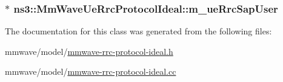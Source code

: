 \subsubsection[{\texorpdfstring{m\+\_\+ue\+Rrc\+Sap\+User}{m_ueRrcSapUser}}]{$\ast$ ns3\+::\+Mm\+Wave\+Ue\+Rrc\+Protocol\+Ideal\+::m\+\_\+ue\+Rrc\+Sap\+User\hspace{0.3cm}{\ttfamily [private]}}\hypertarget{classns3_1_1MmWaveUeRrcProtocolIdeal_abc6f2ed7e6a41200ddf471b23630f1a1}{}\label{classns3_1_1MmWaveUeRrcProtocolIdeal_abc6f2ed7e6a41200ddf471b23630f1a1}


The documentation for this class was generated from the following files\+:\begin{DoxyCompactItemize}
\item 
mmwave/model/\hyperlink{mmwave-rrc-protocol-ideal_8h}{mmwave-\/rrc-\/protocol-\/ideal.\+h}\item 
mmwave/model/\hyperlink{mmwave-rrc-protocol-ideal_8cc}{mmwave-\/rrc-\/protocol-\/ideal.\+cc}\end{DoxyCompactItemize}
